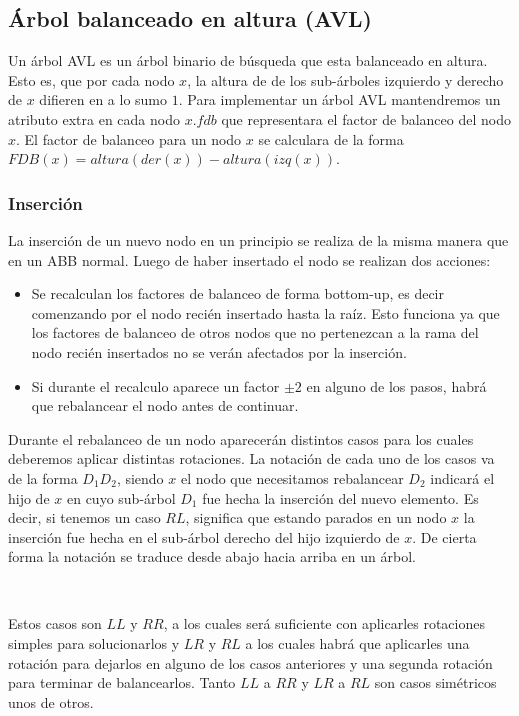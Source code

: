 \subsection{\'Arbol balanceado en altura (AVL)}

Un \'arbol AVL es un \'arbol binario de b\'usqueda que esta balanceado en altura. Esto es, que por cada nodo $x$, la altura de de los sub-\'arboles izquierdo y derecho de $x$ difieren en a lo sumo $1$. Para implementar un \'arbol AVL mantendremos un atributo extra en cada nodo $x.fdb$ que representara el factor de balanceo del nodo $x$. El factor de balanceo para un nodo $x$ se calculara de la forma $FDB(x) = altura(der(x)) - altura(izq(x))$.

\subsubsection{Inserci\'on}

La inserci\'on de un nuevo nodo en un principio se realiza de la misma manera que en un ABB normal. Luego de haber insertado el nodo se realizan dos acciones:

\begin{itemize}
 \item Se recalculan los factores de balanceo de forma bottom-up, es decir comenzando por el nodo reci\'en insertado hasta la ra\'iz. Esto funciona ya que los factores de balanceo de otros nodos que no pertenezcan a la rama del nodo reci\'en insertados no se ver\'an afectados por la inserci\'on.
 \item Si durante el recalculo aparece un factor $\pm 2$ en alguno de los pasos, habr\'a que rebalancear el nodo antes de continuar.
\end{itemize}

Durante el rebalanceo de un nodo aparecer\'an distintos casos para los cuales deberemos aplicar distintas rotaciones. La notaci\'on de cada uno de los casos va de la forma $D_1D_2$, siendo $x$ el nodo que necesitamos rebalancear $D_2$ indicar\'a el hijo de $x$ en cuyo sub-\'arbol $D_1$ fue hecha la inserci\'on del nuevo elemento. Es decir, si tenemos un caso $RL$, significa que estando parados en un nodo $x$ la inserci\'on fue hecha en el sub-\'arbol derecho del hijo izquierdo de $x$. De cierta forma la notaci\'on se traduce desde abajo hacia arriba en un \'arbol.

~

Estos casos son $LL$ y $RR$, a los cuales ser\'a suficiente con aplicarles rotaciones simples para solucionarlos y $LR$ y $RL$ a los cuales habr\'a que aplicarles una rotaci\'on para dejarlos en alguno de los casos anteriores y una segunda rotaci\'on para terminar de balancearlos. Tanto $LL$ a $RR$ y $LR$ a $RL$ son casos sim\'etricos unos de otros.

